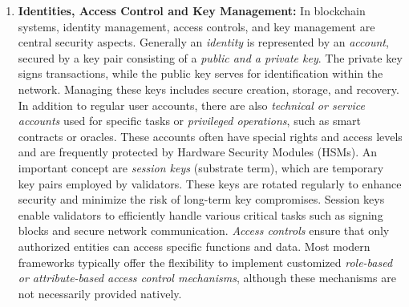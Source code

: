 \begin{enumerate}[label=\textbullet]

	\item\textbf{Identities, Access Control and Key Management:}\cite{nist_pub_key_mgmt}\cite{sub_acc_add_key}\cite{nist_pub_bloc_acc_ctrl}\cite{hype_dkms}
	In blockchain systems, identity management, access controls, and key management are central security aspects. 
	Generally an \textit{identity} is represented by an \textit{account}, secured by a key pair consisting of a \textit{public and a private key}. The private key signs transactions, while the public key serves for identification within the network. Managing these keys includes secure creation, storage, and recovery.
	In addition to regular user accounts, there are also \textit{technical or service accounts} used for specific tasks or \textit{privileged operations}, such as smart contracts or oracles. These accounts often have special rights and access levels and are frequently protected by Hardware Security Modules (HSMs).
	An important concept are \textit{session keys} (substrate term), which are temporary key pairs employed by validators. These keys are rotated regularly to enhance security and minimize the risk of long-term key compromises. Session keys enable validators to efficiently handle various critical tasks such as signing blocks and secure network communication. 
	\textit{Access controls} ensure that only authorized entities can access specific functions and data. Most modern frameworks typically offer the flexibility to implement customized \textit{role-based or attribute-based access control mechanisms}, although these mechanisms are not necessarily provided natively. 


\end{enumerate}
